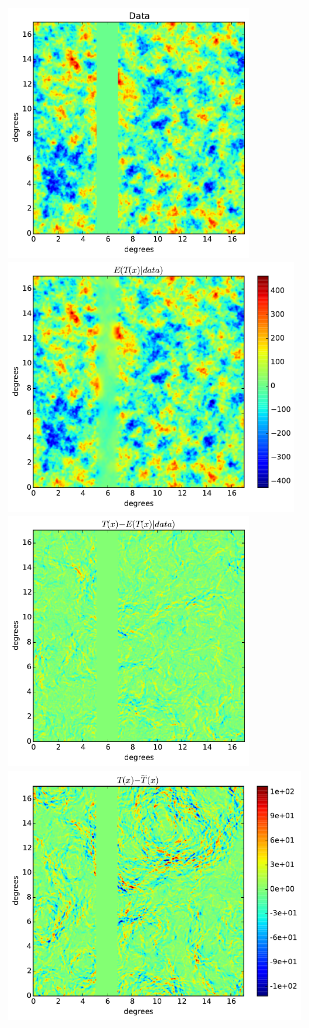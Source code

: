 \documentclass[iop,revtex4,apj,onecolumn]{emulateapj}
\begin{document}
\begin{figure}
\begin{center}
{\includegraphics[height=2.6in]{figure6a.pdf}}%
{\includegraphics[height=2.6in]{figure6b.pdf}}\\
{\includegraphics[height=2.6in]{figure6c.pdf}}%
{\includegraphics[height=2.6in]{figure6d.pdf}}%

\end{center}
\end{figure}
\end{document}
